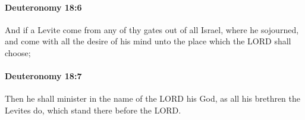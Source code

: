 		\paragraph{Deuteronomy 18:6} %
			\label{DEUTERONOMY-18-6}

			And if a Levite come from any of thy gates out of all Israel, where he sojourned, and come with all the desire of his mind unto the place which the LORD shall choose;


		\paragraph{Deuteronomy 18:7} %
			\label{DEUTERONOMY-18-7}

			Then he shall minister in the name of the LORD his God, as all his brethren the Levites do, which stand there before the LORD.


